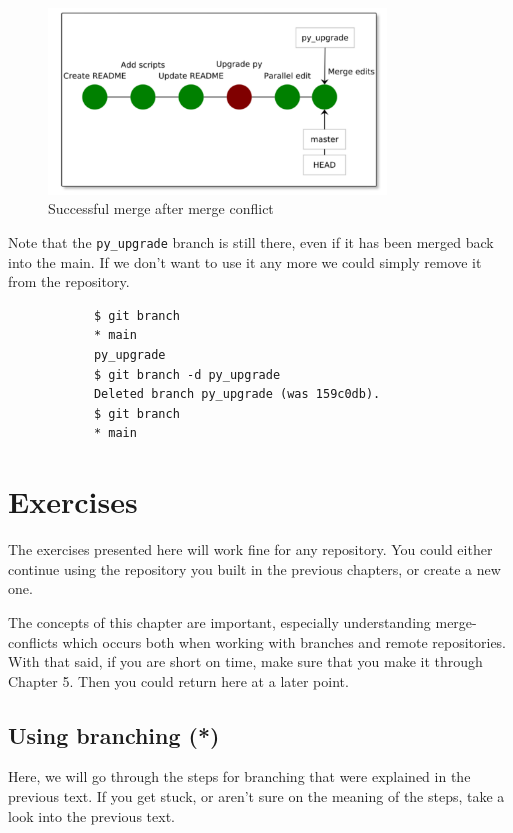 \documentclass[../main/git_course_main.tex]{subfiles}
\begin{document}
	\begin{figure}[h!]
		\centering
		\includegraphics[width=0.8\textwidth]{../visualizations/chapter4/46_successful_merge_post_conflict.pdf}
		\caption{Successful merge after merge conflict}
		\label{fig:after_merged_conflict}
	\end{figure}
	
	Note that the \verb$py_upgrade$ branch is still there, even if it has been merged back into the main.
	If we don't want to use it any more we could simply remove it from the repository.
	
	\begin{codebox}
		\begin{lstlisting}
			$ git branch
			* main
			py_upgrade
			$ git branch -d py_upgrade
			Deleted branch py_upgrade (was 159c0db).
			$ git branch
			* main
		\end{lstlisting}
	\end{codebox}
	
	\newpage
	\section{Exercises}
	
	The exercises presented here will work fine for any repository. You could either continue using the repository you built in the previous chapters, or create a new one.
	
	The concepts of this chapter are important, especially understanding merge-conflicts which occurs both when working with branches and remote repositories. With that said, if you are short on time, make sure that you make it through Chapter 5. Then you could return here at a later point.
	
	\subsection{Using branching (*)}
	
	Here, we will go through the steps for branching that were explained in the previous text. If you get stuck, or aren't sure on the meaning of the steps, take a look into the previous text.
	
\end{document}
